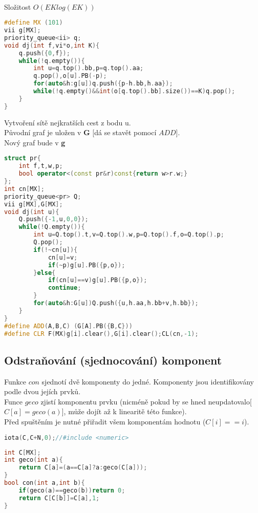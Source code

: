 \documentclass[11pt]{article}
\begin{document}
\\Složitost $O(EKlog(EK))$
\begin{lstlisting}[language=C++]
#define MX (101)
vii g[MX];
priority_queue<ii> q;
void dj(int f,vi*o,int K){
    q.push({0,f});
    while(!q.empty()){
        int u=q.top().bb,p=q.top().aa;
        q.pop(),o[u].PB(-p);
        for(auto&h:g[u])q.push({p-h.bb,h.aa});
        while(!q.empty()&&int(o[q.top().bb].size())==K)q.pop();
    }
}
\end{lstlisting}
Vytvoření sítě nejkratších cest z bodu \textsf{u}.
\\Původní graf je uložen v \textbf{G} [dá se stavět pomocí $ADD$].
\\Nový graf bude v \textbf{g}
\begin{lstlisting}[language=C++]
struct pr{
    int f,t,w,p;
    bool operator<(const pr&r)const{return w>r.w;}
};
int cn[MX];
priority_queue<pr> Q;
vii g[MX],G[MX];
void dj(int u){
    Q.push({-1,u,0,0});
    while(!Q.empty()){
        int u=Q.top().t,v=Q.top().w,p=Q.top().f,o=Q.top().p;
        Q.pop();
        if(!~cn[u]){
            cn[u]=v;
            if(~p)g[u].PB({p,o});
        }else{
            if(cn[u]==v)g[u].PB({p,o});
            continue;
        }
        for(auto&h:G[u])Q.push({u,h.aa,h.bb+v,h.bb});
    }
}
#define ADD(A,B,C) (G[A].PB({B,C}))
#define CLR F(MX)g[i].clear(),G[i].clear();CL(cn,-1);
\end{lstlisting}
\subsection{Odstraňování (sjednocování) komponent}
Funkce $con$ sjednotí dvě komponenty do jedné. Komponenty jsou identifikovány podle dvou jejích prvků.
\\Funce $geco$ zjistí komponentu prvku (nicméně pokud by se hned neupdatovalo[$C[a]=geco(a)$], může dojít až k linearitě této funkce).
\\Před spuštěním je nutné přiřadit všem komponentám hodnotu ($C[i]==i$).
\begin{lstlisting}[language=C++]
iota(C,C+N,0);//#include <numeric>
\end{lstlisting}
\begin{lstlisting}[language=C++]
int C[MX];
int geco(int a){
    return C[a]=(a==C[a]?a:geco(C[a]));
}
bool con(int a,int b){
    if(geco(a)==geco(b))return 0;
    return C[C[b]]=C[a],1;
}
\end{lstlisting}
\end{document}
